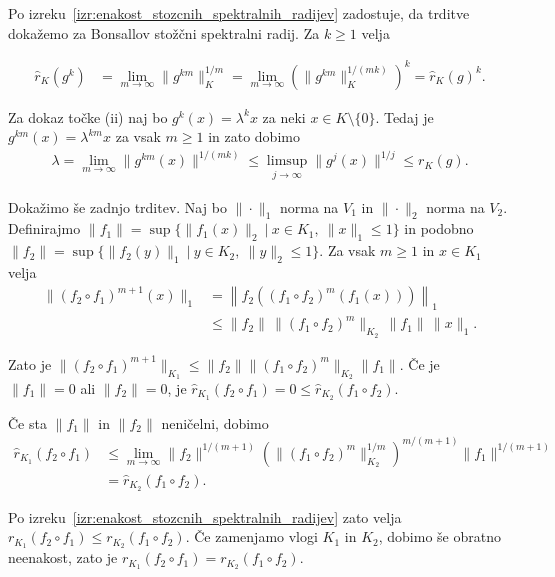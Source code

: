 \documentclass[mat2, tisk]{fmfdelo}
\begin{document}
\begin{dokaz}
  Po izreku~\ref{izr:enakost_stozcnih_spektralnih_radijev} zadostuje,
  da trditve dokažemo za Bonsallov stožčni spektralni radij. Za
  $k\geq1$ velja

  \begin{align*}
  \widehat r_K(g^k)
  &=
  \lim_{m\to\infty}\|g^{km}\|_K^{1/m}
  =
  \lim_{m\to\infty}
  \left(\|g^{km}\|_K^{1/(mk)}\right)^k
  =
  \widehat r_K(g)^k.
  \end{align*}

  Za dokaz točke (ii) naj bo $g^k(x)=\lambda^kx$ za neki
  $x\in K\setminus\{0\}$. Tedaj je $g^{km}(x)=\lambda^{km}x$ za vsak
  $m\geq1$ in zato dobimo 
  \begin{align*}
  \lambda
  =
  \lim_{m\to\infty}\|g^{km}(x)\|^{1/(mk)}
  \leq
  \limsup_{j\to\infty}\|g^j(x)\|^{1/j}
  \leq
  r_K(g).
  \end{align*}

  Dokažimo še zadnjo trditev. Naj bo $\|\cdot\|_1$ norma na $V_1$ in
  $\|\cdot\|_2$ norma na $V_2$. Definirajmo
  $\|f_1\|=\sup\{\|f_1(x)\|_2 ~|~ x\in K_1,\ \|x\|_1\leq1\}$ in podobno
  $\|f_2\|=\sup\{\|f_2(y)\|_1 ~|~ y\in K_2,\ \|y\|_2\leq1\}$.
  Za vsak $m\geq1$ in $x\in K_1$ velja
  \begin{align*}
  \|(f_2\circ f_1)^{m+1}(x)\|_1
  &=
  \left\|
  f_2\left((f_1\circ f_2)^m(f_1(x))\right)
  \right\|_1\\
  &\leq
  \|f_2\|\,
  \|(f_1\circ f_2)^m\|_{K_2}\,
  \|f_1\|\,\|x\|_1.
  \end{align*}

  Zato je
  $\|(f_2\circ f_1)^{m+1}\|_{K_1}
  \leq\|f_2\|\|(f_1\circ f_2)^m\|_{K_2}\|f_1\|$.
  Če je $\|f_1\|=0$ ali $\|f_2\|=0$, je
  $\widehat r_{K_1}(f_2\circ f_1)=0
  \leq\widehat r_{K_2}(f_1\circ f_2)$.

  Če sta $\|f_1\|$ in $\|f_2\|$ neničelni, dobimo
  \begin{align*}
  \widehat r_{K_1}(f_2\circ f_1)
  &\leq
  \lim_{m\to\infty}
  \|f_2\|^{1/(m+1)}
  \left(
  \|(f_1\circ f_2)^m\|_{K_2}^{1/m}
  \right)^{m/(m+1)}
  \|f_1\|^{1/(m+1)}\\
  &=
  \widehat r_{K_2}(f_1\circ f_2).
  \end{align*}

  Po izreku~\ref{izr:enakost_stozcnih_spektralnih_radijev} zato velja
  $r_{K_1}(f_2\circ f_1)\leq r_{K_2}(f_1\circ f_2)$.
  Če zamenjamo vlogi $K_1$ in $K_2$, dobimo še obratno neenakost, zato
  je $r_{K_1}(f_2\circ f_1)=r_{K_2}(f_1\circ f_2)$.
\end{dokaz}
\end{document}
